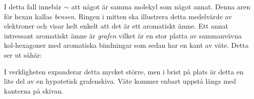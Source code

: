 I detta fall innebär $\sim$ att något är samma molekyl som något annat. Denna aren för hexan kallas \emph{bensen}. Ringen i mitten ska illustrera detta medelvärde av elektroner och visar helt enkelt att det är ett aromatiskt ämne. Ett annat intressant aromatiskt ämne är \emph{grafen} vilket är en stor platta av sammanvävna kol-hexagoner med aromatiska bindningar som sedan har en kant av väte. Detta ser ut såhär:
\begin{center}
\end{center}
I verkligheten expanderar detta mycket större, men i brist på plats är detta en lite del av en hypotetisk grafenskiva. Väte kommer enbart uppstå längs med kanterna på skivan.